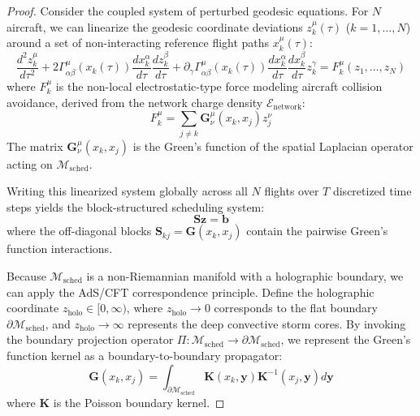 \documentclass[11pt,a4paper]{book}
\begin{document}
\begin{proof}
Consider the coupled system of perturbed geodesic equations. For $N$ aircraft, we can linearize the geodesic coordinate deviations $z^\mu_k(\tau)$ ($k = 1, \dots, N$) around a set of non-interacting reference flight paths $x^\mu_k(\tau)$:
\begin{equation}
\label{eq:linearized_geodesics}
\frac{d^2 z^\mu_k}{d\tau^2} + 2 \Gamma^\mu_{\alpha\beta}\left(x_k(\tau)\right) \frac{dx^\alpha_k}{d\tau} \frac{dz^\beta_k}{d\tau} + \partial_\gamma \Gamma^\mu_{\alpha\beta}\left(x_k(\tau)\right) \frac{dx^\alpha_k}{d\tau} \frac{dx^\beta_k}{d\tau} z^\gamma_k = F^\mu_k\left(z_1, \dots, z_N\right)
\end{equation}
where $F^\mu_k$ is the non-local electrostatic-type force modeling aircraft collision avoidance, derived from the network charge density $\mathcal{E}_{\text{network}}$:
\begin{equation}
\label{eq:interaction_force}
F^\mu_k = \sum_{j \neq k} \mathbf{G}^\mu_{\nu}(x_k, x_j) z^\nu_j
\end{equation}
The matrix $\mathbf{G}^\mu_{\nu}(x_k, x_j)$ is the Green's function of the spatial Laplacian operator acting on $\mathcal{M}_{\text{sched}}$.

Writing this linearized system globally across all $N$ flights over $T$ discretized time steps yields the block-structured scheduling system:
\begin{equation}
\label{eq:block_matrix_system}
\mathbf{S} \mathbf{z} = \mathbf{b}
\end{equation}
where the off-diagonal blocks $\mathbf{S}_{kj} = \mathbf{G}(x_k, x_j)$ contain the pairwise Green's function interactions.

Because $\mathcal{M}_{\text{sched}}$ is a non-Riemannian manifold with a holographic boundary, we can apply the AdS/CFT correspondence principle. Define the holographic coordinate $z_{\text{holo}} \in [0, \infty)$, where $z_{\text{holo}} \to 0$ corresponds to the flat boundary $\partial \mathcal{M}_{\text{sched}}$, and $z_{\text{holo}} \to \infty$ represents the deep convective storm cores. By invoking the boundary projection operator $\Pi: \mathcal{M}_{\text{sched}} \to \partial \mathcal{M}_{\text{sched}}$, we represent the Green's function kernel as a boundary-to-boundary propagator:
\begin{equation}
\label{eq:boundary_propagator}
\mathbf{G}(x_k, x_j) = \int_{\partial \mathcal{M}_{\text{sched}}} \mathbf{K}\left(x_k, \mathbf{y}\right) \mathbf{K}^{-1}\left(x_j, \mathbf{y}\right) d\mathbf{y}
\end{equation}
where $\mathbf{K}$ is the Poisson boundary kernel.


\end{proof}
\end{document}
